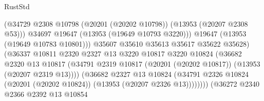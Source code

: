 \begin{lexlean}{RustStd}
\begin{coremodule}
                                              (@34729
                                                @2308
                                                @10798
                                                (@20201 (@20202 @10798))
                                                (@13953 (@20207 @2308 @53)))
                                              @34697
                                              @19647
                                              (@13953 (@19649 @10793 @3220)))
                                            @19647
                                            (@13953 (@19649 @10783 @10801)))
                                          @35607
                                          @35610
                                          @35613
                                          @35617
                                          @35622
                                          @35628)
                                        (@36337
                                          @10811
                                          @2320
                                          @2327
                                          @13
                                          @3220
                                          @10817
                                          @3220
                                          @10824
                                          (@36682
                                            @2320
                                            @13
                                            @10817
                                            (@34791
                                              @2319
                                              @10817
                                              (@20201 (@20202 @10817))
                                              (@13953 (@20207 @2319 @13))))
                                          (@36682
                                            @2327
                                            @13
                                            @10824
                                            (@34791
                                              @2326
                                              @10824
                                              (@20201 (@20202 @10824))
                                              (@13953 (@20207 @2326 @13))))))))
                                  (@36272
                                    @2340
                                    @2366
                                    @2392
                                    @13
                                    @10854

\end{coremodule}
\end{lexlean}
